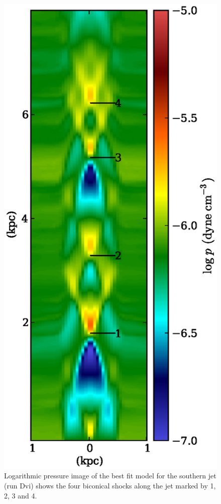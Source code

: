 \begin{figure}[ht!]
\includegraphics[width=\linewidth]{sbm.eps}
\caption{Logarithmic pressure image of the best fit model for the southern jet (run Dvi) shows the four biconical shocks along the jet marked by 1, 2, 3 and 4.}
\label{m_s_p}
\end{figure}


